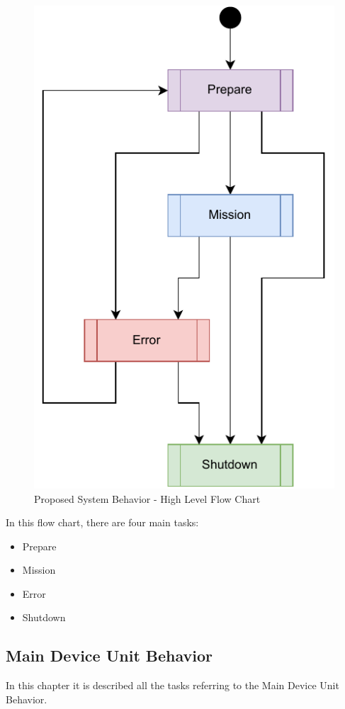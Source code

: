 \begin{figure}[H]
    \centering
    \includegraphics[scale=0.8]{ch3/assets/MDU_MAIN.pdf}
    \caption{Proposed System Behavior - High Level Flow Chart}
    \label{fig:MDU_MAIN}
\end{figure}

In this flow chart, there are four main tasks:
\begin{itemize}
    \item Prepare
    \item Mission
    \item Error
    \item Shutdown
\end{itemize}

\subsection{Main Device Unit Behavior}
In this chapter it is described all the tasks referring to the Main Device Unit Behavior.
